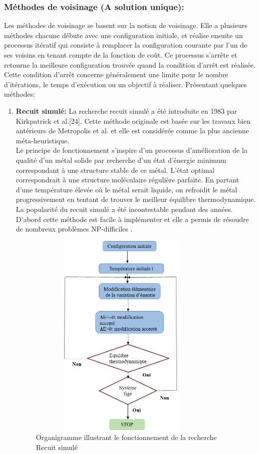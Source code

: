 \subsubsection{Méthodes de voisinage (A solution unique):}
Les méthodes de voisinage se basent sur la notion de voisinage. Elle a plusieurs méthodes chacune débute avec une configuration initiale, et réalise ensuite un processus itératif qui consiste à remplacer la configuration courante par l'un de ses voisins en tenant compte de la fonction de coût. Ce processus s'arrête et retourne la meilleure configuration trouvée quand la condition d'arrêt est réalisée. Cette condition d'arrêt concerne généralement une limite pour le nombre d'itérations, le temps d’exécution ou un objectif à réaliser. Présentant quelques méthodes:

\begin{enumerate}[label=\alph*)]
	\item \textbf{Recuit simulé: } La recherche recuit simulé a été introduite en 1983 par Kirkpatrick et al.[24]. Cette méthode originale est basée sur les travaux bien antérieurs de Metropolis et al. \cite{metropolis1953equation} et elle est considérée comme la plus ancienne méta-heuristique.\\
Le principe de fonctionnement s’inspire d’un processus d’amélioration de la qualité d’un métal solide par recherche d’un état d’énergie minimum correspondant à une structure stable de ce métal. L’état optimal correspondrait à une structure moléculaire régulière parfaite. En partant d’une température élevée où le métal serait liquide, on refroidit le métal progressivement en tentant de trouver le meilleur équilibre thermodynamique.\\
La popularité du recuit simulé a été incontestable pendant des années. D’abord cette méthode est facile à implémenter et elle a permis de résoudre de nombreux problèmes NP-difficiles \cite{bonomi1984n,vidal1993applied}.\\
\begin{figure}[h]
	\centering
	\includegraphics[width=9cm,height=10cm]{Chap2/3.png}
	\caption{Organigramme  illustrant le fonctionnement  de la recherche Recuit simulé}
	\label{fig:OIFRR}
\end{figure}


\end{enumerate}
